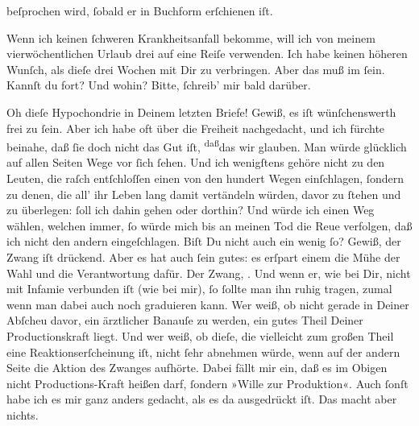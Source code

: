                beſprochen wird, ſobald er in Buchform erſchienen iſt.\pend
           
\pstart
           Wenn ich keinen ſchweren Krankheitsanfall bekomme, will ich von meinem
               vierwöchentlichen Urlaub drei auf eine Reiſe verwenden. Ich habe keinen höheren
               Wunſch, als dieſe drei Wochen mit Dir zu verbringen. Aber das muß im \label{K_L02621-10v}\label{K_L02621-10} ſein.
               Kannſt du fort? Und wohin? Bitte, ſchreib’ mir bald darüber.\pend
           
\pstart
           {\pb}Oh dieſe Hypochondrie in Deinem letzten Briefe!
               Gewiß, es iſt wünſchenswerth frei zu ſein. Aber ich habe oft über die Freiheit
               nachgedacht, und ich fürchte beinahe, daß ſie doch nicht das Gut iſt, \substVorne{}\textsuperscript{daß}\substDazwischen{}das\substHinten{} wir glauben. Man würde glücklich auf allen Seiten Wege vor ſich ſehen. Und
               ich wenigſtens gehöre nicht zu den Leuten, die raſch entſchloſſen einen von den
               hundert Wegen einſchlagen, ſondern zu denen, die all’ ihr Leben lang damit vertändeln
               würden, davor zu ſtehen {\pb}und zu überlegen: ſoll ich
               dahin gehen oder dorthin? Und würde ich einen Weg wählen, welchen immer, ſo würde
               mich bis an meinen Tod die Reue verfolgen, daß ich nicht den andern eingeſchlagen.
               Biſt Du nicht auch ein wenig ſo? Gewiß, der Zwang iſt drückend. Aber es hat auch ſein
               gutes: es erſpart einem die Mühe der Wahl und die Verantwortung dafür. Der Zwang,
                  \label{K_L02621-11v}\label{K_L02621-11}. Und wenn er, wie bei Dir, nicht mit Infamie verbunden iſt (wie
               bei mir), ſo ſollte man ihn {\pb}ruhig tragen, zumal
               wenn man dabei auch noch graduieren kann. Wer weiß, ob nicht gerade in Deiner Abſcheu
               davor, ein ärztlicher  Banauſe zu werden, ein
               gutes Theil Deiner Productionskraft liegt. Und wer weiß, ob dieſe, die vielleicht zum
               großen Theil eine Reaktionserſcheinung iſt, nicht ſehr abnehmen würde, wenn auf der
               andern Seite die Aktion des Zwanges aufhörte. Dabei fällt mir ein, daß es im Obigen
               nicht Productions-Kraft heißen darf, ſondern »Wille zur Produktion«. Auch ſonſt habe
               ich es mir ganz {\pb}anders gedacht, als es da
               ausgedrückt iſt. Das macht aber nichts.\pend
           
